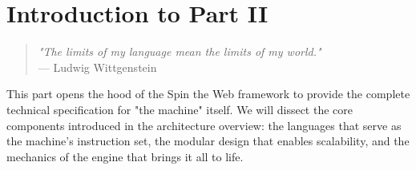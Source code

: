 
\chapter*{Introduction to Part II}
\label{part:framework-mechanics}

\begin{quote}
\textit{"The limits of my language mean the limits of my world."} \\
— Ludwig Wittgenstein
\end{quote}

This part opens the hood of the Spin the Web framework to provide the complete technical specification for "the machine" itself. We will dissect the core components introduced in the architecture overview: the languages that serve as the machine's instruction set, the modular design that enables scalability, and the mechanics of the engine that brings it all to life.

